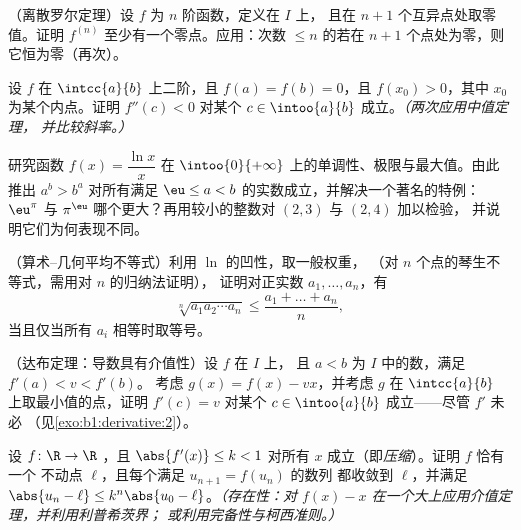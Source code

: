 \begin{exercise}[$\star\star$]\label{exo:b1:derivative:6}
（离散罗尔定理）设 $f$ 为 $n$ 阶函数，定义在 $I$ 上，
且在 $n + 1$ 个互异点处取零值。证明 $f^{(n)}$
至少有一个零点。应用：次数 $\leq n$ 的若在
$n+1$ 个点处为零，则它恒为零（再次）。
\end{exercise}

\begin{exercise}[$\star\star$]\label{exo:b1:derivative:7}
设 $f$ 在 $\intcc{a}{b}$ 上二阶，且 $f(a) = f(b)
= 0$，且 $f(x_0) > 0$，其中 $x_0$ 为某个内点。证明 $f''(c) <
0$ 对某个 $c \in \intoo{a}{b}$ 成立。\emph{（两次应用中值定理，
并比较斜率。）}
\end{exercise}

\begin{exercise}[$\star\star$]\label{exo:b1:derivative:8}
研究函数 $f(x) = \dfrac{\ln x}{x}$ 在
$\intoo{0}{+\infty}$ 上的单调性、极限与最大值。由此推出 $a^b
> b^a$ 对所有满足 $\eu \leq a < b$ 的实数成立，并解决一个著名的特例：
$\eu^\pi$ 与 $\pi^\eu$ 哪个更大？再用较小的整数对
$(2,3)$ 与 $(2,4)$ 加以检验，
并说明它们为何表现不同。
\end{exercise}

\begin{exercise}[$\star\star$]\label{exo:b1:derivative:9}
（算术--几何平均不等式）利用 $\ln$ 的凹性，取一般权重，
（对 $n$ 个点的琴生不等式，需用对 $n$ 的归纳法证明），
证明对正实数 $a_1, \dots, a_n$，有
\[
\sqrt[n]{a_1 a_2 \cdots a_n} \leq \frac{a_1 + \dots + a_n}{n},
\]
当且仅当所有 $a_i$ 相等时取等号。
\end{exercise}

\begin{exercise}[$\star\star\star$]\label{exo:b1:derivative:10}
（达布定理：导数具有介值性）设 $f$ 在 $I$ 上，
且 $a < b$ 为 $I$ 中的数，满足 $f'(a) < v < f'(b)$。
考虑 $g(x) = f(x) - vx$，并考虑 $g$ 在
$\intcc{a}{b}$ 上取最小值的点，证明 $f'(c) = v$ 对某个 $c
\in \intoo{a}{b}$ 成立——尽管 $f'$ 未必
（见\cref{exo:b1:derivative:2}）。
\end{exercise}

\begin{exercise}[$\star\star\star$]\label{exo:b1:derivative:11}
设 $f \colon \R \to \R$ ，且 $\abs{f'(x)} \leq k
< 1$ 对所有 $x$ 成立（即\emph{压缩}）。证明 $f$ 恰有一个
不动点 $\ell$，且每个满足 $u_{n+1} = f(u_n)$ 的数列
都收敛到 $\ell$，并满足 $\abs{u_n - \ell} \leq k^n\abs{u_0 -
\ell}$。\emph{（存在性：对
$f(x) - x$ 在一个大上应用介值定理，并利用利普希茨界；
或利用完备性与柯西准则。）}
\end{exercise}

